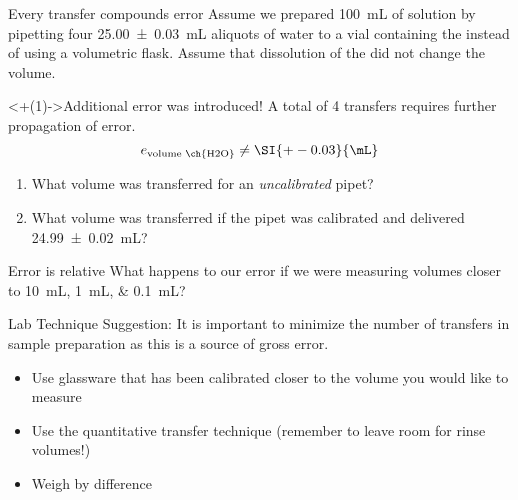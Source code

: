 \documentclass[notes=only]{beamer}
\begin{document}
\begin{frame}[t]{Every transfer compounds error}
	Assume we prepared \SI{100}{\milli\liter} of solution by pipetting four
	\SI{25.00 +- 0.03}{\milli\liter} aliquots of water to a vial containing
	the  instead of using a volumetric flask. Assume
	that dissolution of the  did not change the volume.

	\begin{alertblock}<+(1)->{Additional error was introduced!}
		A total of 4 transfers requires further propagation of error.
		\begin{equation*}
			e_\text{volume~\ch{H2O}} \neq \SI{+-0.03}{\mL}
		\end{equation*}
	\end{alertblock}

	\begin{enumerate}[<+(1)->]
		\item What volume was transferred for an \emph{uncalibrated}
			pipet?
		\item What volume was transferred if the pipet was calibrated
			and delivered \SI{24.99(2)}{\mL}?
	\end{enumerate}
\end{frame}

\begin{frame}{Error is relative}
	What happens to our error if we were measuring volumes closer to
	\SIlist[list-final-separator={, or }]{10;1;0.1}{\mL}?

	\bigskip

	\pause

	\begin{block}{Lab Technique Suggestion:}
		It is important to minimize the number of transfers in sample
		preparation as this is a source of \alert{gross error}.
		\begin{itemize}
			\item Use glassware that has been calibrated closer to
				the volume you would like to measure
			\item Use the quantitative transfer technique (remember
				to leave room for rinse volumes!)
			\item Weigh by difference
		\end{itemize}
	\end{block}
\end{frame}
\end{document}

